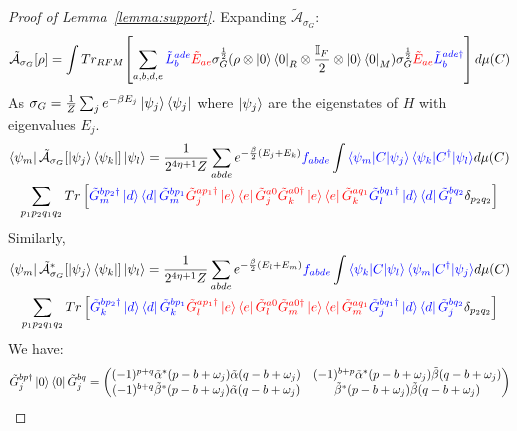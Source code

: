 \documentclass[aps,floatfix,10pt,amssymb,amsfont,amsmath,superscriptaddress,float,nofootinbib,longbibliography,nobalancelastpage,twocolumn]{revtex4-2}
\begin{document}
\begin{proof}[Proof of Lemma~\ref{lemma:support}]
Expanding $\tilde{\mathcal{A}}_{\sigma_G}$:
    \begin{equation}
    \tilde{\mathcal{A}}_{\sigma_G}[\rho] = \int Tr_{RFM}\!\left[\sum_{a,b,d,e}\textcolor{blue}{\tilde L^{ade}_b} \textcolor{red}{\tilde E_{ae}} \sigma_G^{\frac{1}{2}} (\rho\otimes \ket{0}\bra{0}_R \otimes \frac{\mathbb{I}_F}{2}\otimes \ket{0}\bra{0}_M) \sigma_G^{\frac{1}{2}}\textcolor{red}{\tilde E_{ae}}\textcolor{blue}{\tilde L^{ade\dagger}_b}\right] d\mu(C)
\end{equation}
As $\sigma_G = \frac{1}{Z}\sum_j e^{-\beta E_j} \ket{\psi_j}\bra{\psi_j}$ where $\ket{\psi_j}$ are the eigenstates of $H$ with eigenvalues $E_j$. 
\begin{multline}
    \bra{\psi_m}\tilde{\mathcal{A}}_{\sigma_G}[\ket{\psi_j}\bra{\psi_k}]\ket{\psi_l}=\frac{1}{2^{4\eta+1}Z} \sum_{abde} e^{-\frac{\beta}{2}(E_j+E_k)}\textcolor{blue}{f_{abde}} \int \textcolor{blue}{\braket{\psi_m|C|\psi_j}\braket{\psi_k|C^{\dagger}|\psi_l}} d\mu(C)\\\sum_{p_1p_2q_1 q_2}Tr\left[\textcolor{blue}{\tilde G^{bp_2\dagger}_m\ket{d}\bra{d}\tilde G^{bp_1}_m} \textcolor{red}{\tilde G_j^{ap_1\dagger}\ket{e}\bra{e}\tilde G_j^{a0}\tilde G_k^{a0\dagger}\ket{e}\bra{e}\tilde G_k^{aq_1}} \textcolor{blue}{\tilde G^{bq_1\dagger}_l\ket{d}\bra{d}\tilde G^{bq_2}_l} \delta_{p_2q_2}\right]
    \label{eq:Arho}
\end{multline}
Similarly,
\begin{multline}
   \bra{\psi_m}\tilde{\mathcal{A}}^*_{\sigma_G}[\ket{\psi_j}\bra{\psi_k}]\ket{\psi_l} =\frac{1}{2^{4\eta+1}Z} \sum_{abde} e^{-\frac{\beta}{2}(E_l+E_m)}\textcolor{blue}{f_{abde}} \int \textcolor{blue}{\braket{\psi_k|C|\psi_l}\braket{\psi_m|C^{\dagger}|\psi_j}} d\mu(C)\\\sum_{p_1p_2 q_1 q_2} Tr\left[\textcolor{blue}{\tilde G^{bp_2\dagger}_k\ket{d}\bra{d}\tilde G^{bp_1}_k} \textcolor{red}{\tilde G_l^{ap_1\dagger}\ket{e}\bra{e}\tilde G_l^{a0}\tilde G_m^{a0\dagger}\ket{e}\bra{e}\tilde G_m^{aq_1}} \textcolor{blue}{\tilde G^{bq_1\dagger}_j\ket{d}\bra{d}\tilde G^{bq_2}_j } \delta_{p_2q_2}\right]
    \label{eq:A*rho}
\end{multline}
We have:
\begin{equation}
    \tilde G^{bp\dagger}_{j}\ket{0}\bra{0} \tilde G^{bq}_{j} = \begin{pmatrix}
        (-1)^{p+q}\tilde \alpha^*(p-b+\omega_{j})\tilde  \alpha(q-b+\omega_{j}) &(-1)^{b+p}\tilde  \alpha^*(p-b+\omega_{j})\tilde  \beta(q-b+\omega_{j})  \\(-1)^{b+q}\tilde  \beta^*(p-b+\omega_{j})\tilde  \alpha(q-b+\omega_{j}) & \tilde  \beta^*(p-b+\omega_{j})\tilde  \beta(q-b+\omega_{j})

\end{pmatrix}
\end{equation}
\end{proof}
\end{document}
